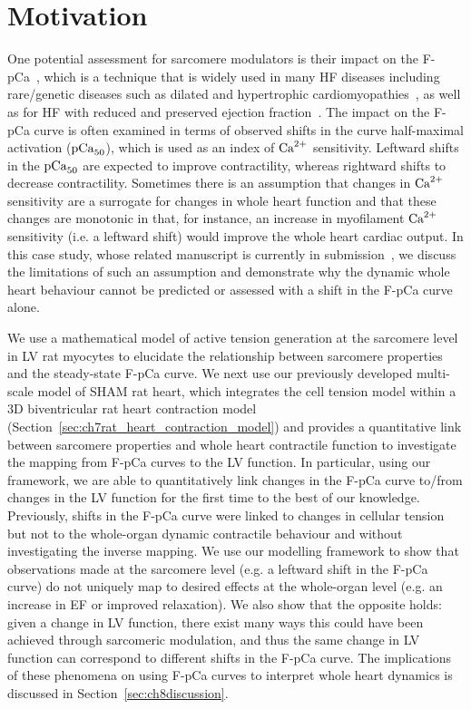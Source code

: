 \section{Motivation}\label{sec:ch8motivation}
One potential assessment for sarcomere modulators is their impact on the F-pCa~\cite{Walker:2010}, which is a technique that is widely used in many HF diseases including rare/genetic diseases such as dilated and hypertrophic cardiomyopathies~\cite{Groen:2020,Bai:2013,Michael:2016,Kirschner:2005,Harris:2002}, as well as for HF with reduced and preserved ejection fraction~\cite{Nagy:2015,Kampourakis:2018,Kieu:2019,Awinda:2021,Mamidi:2018,Sparrow:2020}. The impact on the F-pCa curve is often examined in terms of observed shifts in the curve half-maximal activation ($\textrm{pCa}_{50}$), which is used as an index of $\textrm{Ca}^{2+}$ sensitivity. Leftward shifts in the $\textrm{pCa}_{50}$ are expected to improve contractility, whereas rightward shifts to decrease contractility. Sometimes there is an assumption that changes in $\textrm{Ca}^{2+}$ sensitivity are a surrogate for changes in whole heart function and that these changes are monotonic in that, for instance, an increase in myofilament $\textrm{Ca}^{2+}$ sensitivity (i.e. a leftward shift) would improve the whole heart cardiac output. In this case study, whose related manuscript is currently in submission~\cite{Longobardi:2022}, we discuss the limitations of such an assumption and demonstrate why the dynamic whole heart behaviour cannot be predicted or assessed with a shift in the F-pCa curve alone.

\vspace{0.2cm}
We use a mathematical model of active tension generation at the sarcomere level in LV rat myocytes to elucidate the relationship between sarcomere properties and the steady-state F-pCa curve. We next use our previously developed multi-scale model of SHAM rat heart, which integrates the cell tension model within a $3$D biventricular rat heart contraction model (Section~\ref{sec:ch7rat_heart_contraction_model}) and provides a quantitative link between sarcomere properties and whole heart contractile function to investigate the mapping from F-pCa curves to the LV function. In particular, using our framework, we are able to quantitatively link changes in the F-pCa curve to/from changes in the LV function for the first time to the best of our knowledge. Previously, shifts in the F-pCa curve were linked to changes in cellular tension~\cite{Chung:2016} but not to the whole-organ dynamic contractile behaviour and without investigating the inverse mapping. We use our modelling framework to show that observations made at the sarcomere level (e.g. a leftward shift in the F-pCa curve) do not uniquely map to desired effects at the whole-organ level (e.g. an increase in EF or improved relaxation). We also show that the opposite holds: given a change in LV function, there exist many ways this could have been achieved through sarcomeric modulation, and thus the same change in LV function can correspond to different shifts in the F-pCa curve. The implications of these phenomena on using F-pCa curves to interpret whole heart dynamics is discussed in Section~\ref{sec:ch8discussion}.


